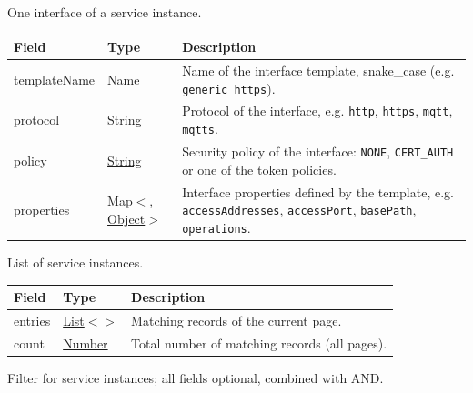 \documentclass[a4paper]{arrowhead}
\newcommand{\mref}[2][]{{\textcolor{ArrowheadPurple}{\hyperref[sec:model:#2]{\ifstrempty{#1}{#2}{#1}}}}}
\newcommand{\pref}[1]{{\textcolor{ArrowheadGrey}{\hyperref[sec:model:primitives:#1]{#1}}}}
\begin{document}

One interface of a service instance.


\noindent\begin{tabularx}{\textwidth}{| >{\raggedright\arraybackslash}p{3.9cm} | >{\raggedright\arraybackslash\small}p{5.3cm} | X |} \hline
\rowcolor{gray!33} Field & Type & Description \\ \hline
template\allowbreak{}Name & \pref{Name} & Name of the interface template, snake\_case (e.g. \texttt{generic\_\allowbreak{}https}). \\ \hline
protocol & \pref{String} & Protocol of the interface, e.g. \texttt{http}, \texttt{https}, \texttt{mqtt}, \texttt{mqtts}. \\ \hline
policy & \pref{String} & Security policy of the interface: \texttt{NONE}, \texttt{CERT\_\allowbreak{}AUTH} or one of the token policies. \\ \hline
properties & \pref{Map}$<$\allowbreak{}\pref{String}, \pref{Object}$>$ & Interface properties defined by the template, e.g. \texttt{accessAddresses}, \texttt{accessPort}, \texttt{basePath}, \texttt{operations}. \\ \hline
\end{tabularx}




List of service instances.


\noindent\begin{tabularx}{\textwidth}{| >{\raggedright\arraybackslash}p{3.9cm} | >{\raggedright\arraybackslash\small}p{5.3cm} | X |} \hline
\rowcolor{gray!33} Field & Type & Description \\ \hline
entries & \pref{List}$<$\allowbreak{}\mref{ServiceInstanceResponse}$>$ & Matching records of the current page. \\ \hline
count & \pref{Number} & Total number of matching records (all pages). \\ \hline
\end{tabularx}




Filter for service instances; all fields optional, combined with AND.
\end{document}
